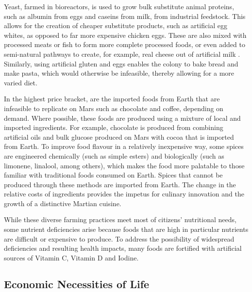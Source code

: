 \documentclass[fleqn,10pt]{Stylesheet} %
\begin{document}
Yeast, farmed in bioreactors, is used to grow bulk substitute animal proteins, such as albumin from eggs and caseins from milk, from industrial feedstock. This allows for the creation of cheaper substitute products, such as artificial egg whites, as opposed to far more expensive chicken eggs. These are also mixed with processed meats or fish to form more complete processed foods, or even added to semi-natural pathways to create, for example, real cheese out of artificial milk \cite{Pandya2017}. Similarly, using artificial gluten and eggs enables the colony to bake bread and make pasta, which would otherwise be infeasible, thereby allowing for a more varied diet.

In the highest price bracket, are the imported foods from Earth that are infeasible to replicate on Mars such as chocolate and coffee, depending on demand. Where possible, these foods are produced using a mixture of local and imported ingredients. For example, chocolate is produced from combining artificial oils and bulk glucose produced on Mars with cocoa that is imported from Earth. To improve food flavour in a relatively inexpensive way, some spices are engineered chemically (such as simple esters) and biologically (such as limonene, linalool, among others), which makes the food more palatable to those familiar with traditional foods consumed on Earth. Spices that cannot be produced through these methods are imported from Earth. The change in the relative costs of ingredients provides the impetus for culinary innovation and the growth of a distinctive Martian cuisine.

While these diverse farming practices meet most of citizens' nutritional needs, some nutrient deficiencies arise because foods that are high in particular nutrients are difficult or expensive to produce. To address the possibility of widespread deficiencies and resulting health impacts, many foods are fortified with artificial sources of Vitamin C, Vitamin D and Iodine.


\subsection{Economic Necessities of Life}
\end{document}
